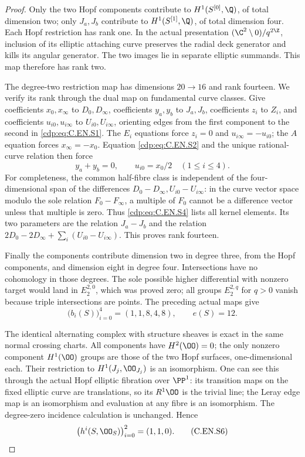 \begin{proof}
Only the two Hopf components contribute to $H^1(S^{[0]},\Q)$,
of total dimension two; only $J_a,J_b$ contribute to
$H^1(S^{[1]},\Q)$, of total dimension four.
Each Hopf restriction has rank one. In the actual presentation
$(\C^2\setminus0)/q^{2\Z}$, inclusion of its elliptic
attaching curve preserves the radial deck generator and
kills its angular generator. The two images lie in separate
elliptic summands. This map therefore has rank two.

The degree-two restriction map has dimensions $20\to16$
and rank fourteen. We verify its rank through the dual map
on fundamental curve classes. Give coefficients
$x_0,x_\infty$ to $D_0,D_\infty$, coefficients $y_a,y_b$
to $J_a,J_b$, coefficients $z_i$ to $Z_i$, and coefficients
$u_{i0},u_{i\infty}$ to $U_{i0},U_{i\infty}$, orienting
edges from the first component to the second in \eqref{cdp:eq:C.EN.S1}.
The $E_i$ equations force
$z_i=0$ and $u_{i\infty}=-u_{i0}$; the $A$ equation
forces $x_\infty=-x_0$. Equation \eqref{cdp:eq:C.EN.S2} and the unique
rational-curve relation then force
\[
 y_a+y_b=0,\qquad u_{i0}=x_0/2\quad(1\le i\le4).
                                                               \tag{C.EN.S4}\label{cdp:eq:C.EN.S4}
\]
For completeness, the common half-fibre class is independent
of the four-dimensional span of the differences
$D_0-D_\infty,U_{i0}-U_{i\infty}$: in the curve vector
space modulo the sole relation $F_0-F_\infty$, a multiple
of $F_0$ cannot be a difference vector unless that multiple
is zero. Thus \eqref{cdp:eq:C.EN.S4} lists all kernel elements. Its two
parameters are the relation $J_a-J_b$ and the relation
$2D_0-2D_\infty+\sum_i(U_{i0}-U_{i\infty})$.
This proves rank fourteen.

Finally the components contribute dimension two in degree
three, from the Hopf components, and dimension eight in
degree four. Intersections have no cohomology in those
degrees. The sole possible higher differential with nonzero
target would land in $E_2^{2,0}$, which was proved zero;
all groups $E_2^{2,q}$ for $q>0$ vanish because triple
intersections are points. The preceding actual maps give
\[
 \bigl(b_i(S)\bigr)_{i=0}^4=(1,1,8,4,8),\qquad e(S)=12.
                                                               \tag{C.EN.S5}\label{cdp:eq:C.EN.S5}
\]

The identical alternating complex with structure sheaves
is exact in the same normal crossing charts. All components
have $H^2(\OO)=0$; the only nonzero component $H^1(\OO)$
groups are those of the two Hopf surfaces, one-dimensional
each. Their restriction to $H^1(J_j,\OO_{J_j})$ is an
isomorphism. One can see this through the actual Hopf
elliptic fibration over $\PP^1$: its transition maps on the
fixed elliptic curve are translations, so its $R^1\OO$
is the trivial line; the Leray edge map is an isomorphism
and evaluation at any fibre is an isomorphism. The degree-zero
incidence calculation is unchanged. Hence
\[
 \bigl(h^i(S,\OO_S)\bigr)_{i=0}^2=(1,1,0).
                                                               \tag{C.EN.S6}\label{cdp:eq:C.EN.S6}
\]


\end{proof}
